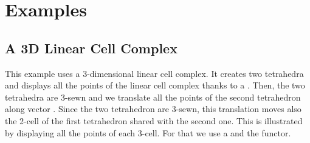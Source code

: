 
\section{Examples}

\subsection{A 3D Linear Cell Complex}\label{ssec-3D-lcc}

This example uses a 3-dimensional linear cell complex. It creates two
tetrahedra and displays all the points of the linear cell complex
thanks to a . Then, the two
tetrahedra are 3-sewn and we translate all the points of the second
tetrahedron along vector .  Since the two tetrahedron
are 3-sewn, this translation moves also the 2-cell of the first
tetrahedron shared with the second one.  This is illustrated by
displaying all the points of each 3-cell. For that we use a
 and the  functor.

